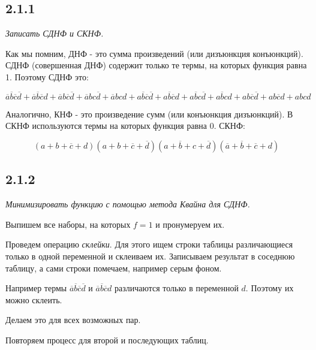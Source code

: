 \documentclass[a4paper,12pt]{article}
\begin{document}
\subsection*{2.1.1}

\textit{Записать СДНФ и СКНФ.}

Как мы помним, ДНФ - это сумма произведений (или дизъюнкция конъюнкций).
СДНФ (совершенная ДНФ) содержит только те термы, на которых функция равна 1.
Поэтому СДНФ это:

\[\overline{a}\overline{b}\overline{c}\overline{d} + \overline{a}\overline{b}\overline{c}d + \overline{a}b\overline{c}\overline{d} + \overline{a}bc\overline{d} + \overline{a}bcd + a\overline{b}\overline{c}\overline{d} + a\overline{b}\overline{c}d + a\overline{b}c\overline{d} + a\overline{b}cd + ab\overline{c}\overline{d} + ab\overline{c}d + abcd\]

 Аналогично, КНФ - это произведение сумм (или конъюнкция дизъюнкций).
В СКНФ используются термы на которых функция равна 0.
СКНФ:

\[(a + b + \overline{c} + d)(a + b + \overline{c} + \overline{d})(a + \overline{b} + c + \overline{d})(\overline{a} + \overline{b} + \overline{c} + d)\]




\subsection*{2.1.2}

\textit{Минимизировать функцию с помощью метода Квайна для СДНФ.}

Выпишем все наборы, на которых $f = 1$ и пронумеруем их.

Проведем операцию \emph{склейки}.
Для этого ищем строки таблицы различающиеся только в одной переменной и склеиваем их.
Записываем результат в соседнюю таблицу, а сами строки помечаем, например серым фоном.

Например термы $\overline{a}\overline{b}\overline{c}\overline{d}$ и $\overline{a}\overline{b}\overline{c}d$ различаются только в переменной $d$.
Поэтому их можно склеить.

Делаем это для всех возможных пар.

Повторяем процесс для второй и последующих таблиц.
\end{document}
